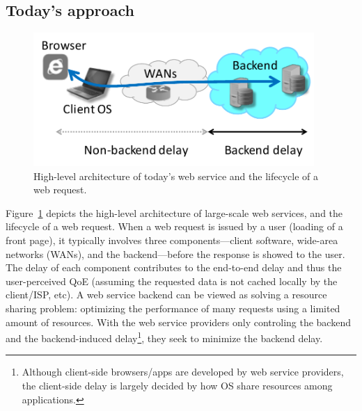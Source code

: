 \subsection{Today's approach}
\begin{figure}
	\centering
	\includegraphics[width=0.95\textwidth]{figs/background.pdf}
	\caption{High-level architecture of today's web service and the lifecycle of a web request.}
	\label{fig:background}
\end{figure}
Figure~\ref{fig:background} depicts the high-level architecture of large-scale web services, and the lifecycle of a web request.
When a web request is issued by a user (\eg loading of a front page), it typically involves three components---client software, wide-area networks (WANs), and the backend---before the response is showed to the user.
The delay of each component contributes to the end-to-end delay and thus the user-perceived QoE (assuming the requested data is not cached locally by the client/ISP, etc). 
A web service backend can be viewed as solving a resource sharing problem: optimizing the performance of many requests using a limited amount of resources. 
With the web service providers only controling the backend and the backend-induced delay\footnote{Although client-side browsers/apps are developed by web service providers, the client-side delay is largely decided by how OS share resources among applications.}, they seek to minimize the backend delay. 



